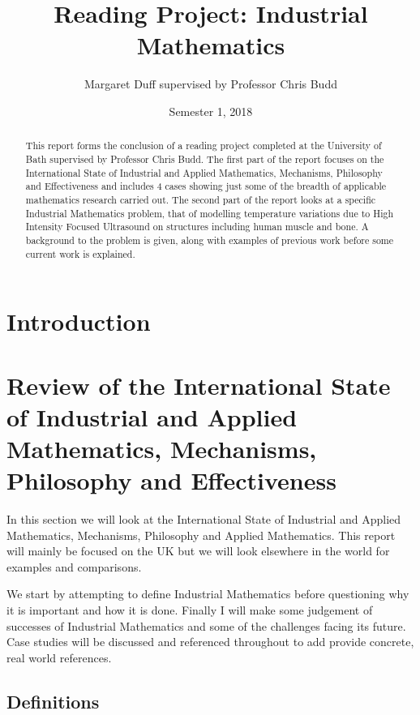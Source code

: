 \documentclass[11pt]{article} %
\begin{document}
	
	\title{Reading Project: Industrial Mathematics }
	
	\author{Margaret Duff  supervised by Professor Chris Budd}
	\date{Semester 1, 2018}
	\maketitle
	
	\begin{abstract}
		This report forms the conclusion of a reading project completed at the University of Bath supervised by Professor Chris Budd. 
		The first part of the report focuses on the International State of Industrial and Applied Mathematics, Mechanisms, Philosophy and Effectiveness and includes 4 cases showing just some of the breadth of applicable mathematics research carried out. The second part of the report looks at a specific Industrial Mathematics problem, that of modelling temperature variations due to High Intensity Focused Ultrasound on structures including human muscle and bone. A background to the problem is given, along with examples of previous work before some current work is explained.  
	\end{abstract}
	\tableofcontents 
	
	\section{Introduction}
	
	\section{Review of the International State of Industrial and Applied Mathematics, Mechanisms, Philosophy and Effectiveness}
	
	In this section we will look at the International State of Industrial and Applied Mathematics, Mechanisms, Philosophy and Applied Mathematics. This report will mainly be  focused on the UK but we will look elsewhere in the world for examples and comparisons. 
	
	We start by attempting to define Industrial Mathematics before questioning why it is important  and how it is done. Finally I will make some judgement of successes of Industrial Mathematics  and some of the challenges facing its future. Case studies will be discussed and referenced throughout to add provide concrete, real world references. 
	
	\subsection{Definitions} 
	
\end{document}
